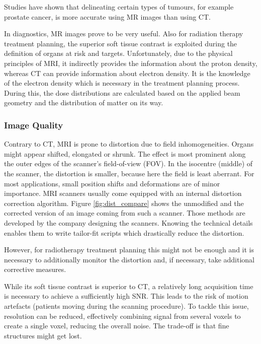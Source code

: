 Studies have shown that delineating certain types of tumours, for example prostate cancer, is more accurate using MR images than using CT. \cite{Rasch1999, Debois1999, Roach1996}

In diagnostics, MR images prove to be very useful.
Also for radiation therapy treatment planning, the superior soft tissue contrast is exploited during the definition of organs at risk and targets.
Unfortunately, due to the physical principles of MRI, it indirectly provides the information about the proton density, whereas CT can provide information about electron density.
It is the knowledge of the electron density which is necessary in the treatment planning process.
During this, the dose distributions are calculated based on the applied beam geometry and the distribution of matter on its way.


\subsubsection{Image Quality}
Contrary to CT, MRI is prone to distortion due to field inhomogeneities.
Organs might appear shifted, elongated or shrunk.
The effect is most prominent along the outer edges of the scanner's field-of-view (FOV).
In the isocentre (middle) of the scanner, the distortion is smaller, because here the field is least aberrant.
For most applications, small position shifts and deformations are of minor importance.
MRI scanners usually come equipped with an internal distortion correction algorithm.
Figure \ref{fig:dist_compare} shows the unmodified and the corrected version of an image coming from such a scanner.
Those methods are developed by the company designing the scanners.
Knowing the technical details enables them to write tailor-fit scripts which drastically reduce the distortion.

However, for radiotherapy treatment planning this might not be enough and it is necessary to additionally monitor the distortion and, if necessary, take additional corrective measures. 

While its soft tissue contrast is superior to CT, a relatively long acquisition time is necessary to achieve a sufficiently high SNR.
This leads to the risk of motion artefacts (patients moving during the scanning procedure).
To tackle this issue, resolution can be reduced, effectively combining signal from several voxels to create a single voxel, reducing the overall noise.
The trade-off is that fine structures might get lost.

